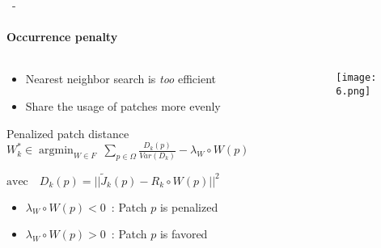 \documentclass[aspectratio=169, 22pt]{beamer}
\DeclareMathOperator*{\argmin}{argmin}
\begin{document}
\begin{frame}{\secname~- \subsecname}
  \framesubtitle{Occurrence penalty}
  \begin{columns}
    \begin{column}{0.5\linewidth}
        \begin{itemize}
        \item Nearest neighbor search is \emph{too} efficient
        \item Share the usage of patches more evenly
        \end{itemize}

      \begin{block}{Penalized patch distance}
        \centering
        \small
        $W_k^* \in \argmin_{W \in F}\ \sum_{p \in \Omega} \frac{D_k(p)}{Var(D_k)} - \lambda_W \circ W(p)$
        
        $\text{avec} \quad D_k(p) = ||\tilde{J}_k(p) - R_k \circ W(p)||^2$
      \end{block}
      \begin{itemize}
      \item $\lambda_W \circ W(p) < 0$~: Patch $p$ is penalized
      \item $\lambda_W \circ W(p) > 0$~: Patch $p$ is favored
      \end{itemize}
    \end{column}
    \begin{column}{0.5\linewidth}
      \begin{figure}
        \centering
        \texttt{[image: 6.png]}
      \end{figure}
    \end{column}
  \end{columns}
\end{frame}
\end{document}
